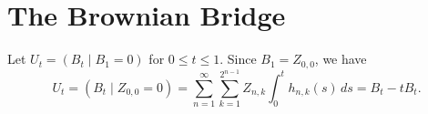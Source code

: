 \documentclass[../../../Master/AppliedStochastics.tex]{subfiles}
\begin{document}
\section{The Brownian Bridge}
Let $U_t=(B_t\mid B_1=0)$ for $0\leq t\leq 1$. Since $B_1=Z_{0,0}$, we have $$U_t=(B_t\mid Z_{0,0}=0)=\sum_{n=1}^\infty\sum_{k=1}^{2^{n-1}}Z_{n,k}\int_0^th_{n,k}(s)\,ds=B_t-tB_t.$$


%
\end{document}

